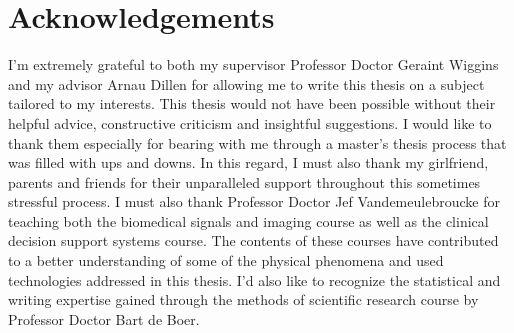 
\chapter{Acknowledgements}
\label{ch:acknowledgements}


I'm extremely grateful to both my supervisor Professor Doctor Geraint Wiggins and my advisor Arnau Dillen for allowing me to write this thesis on a subject tailored to my interests.
This thesis would not have been possible without their helpful advice, constructive criticism and insightful suggestions.
I would like to thank them especially for bearing with me through a master's thesis process that was filled with ups and downs.
In this regard, I must also thank my girlfriend, parents and friends for their unparalleled support throughout this sometimes stressful process.
I must also thank Professor Doctor Jef Vandemeulebroucke for teaching both the biomedical signals and imaging course as well as the clinical decision support systems course.
The contents of these courses have contributed to a better understanding of some of the physical phenomena and used technologies addressed in this thesis.
I'd also like to recognize the statistical and writing expertise gained through the methods of scientific research course by Professor Doctor Bart de Boer.

